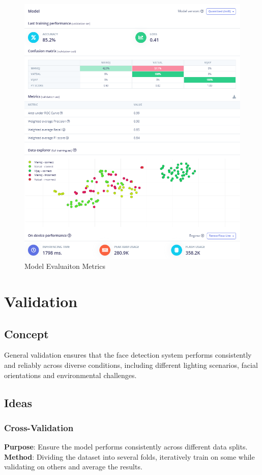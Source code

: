 \begin{figure}
	\begin{center}
		\includegraphics[width=0.7\linewidth]{Images/EdgeImpulse/Interpretation.png}
		\caption{Model Evaluaiton Metrics}
		\label{EvaluationResults}
	\end{center}
\end{figure}

\section{Validation}
\subsection{Concept}
General validation ensures that the face detection system performs consistently and reliably across diverse conditions, including different lighting scenarios, facial orientations and environmental challenges. 

\subsection{Ideas}
\subsubsection{Cross-Validation}
\textbf{Purpose}: Ensure the model performs consistently across different data splits.
\\
\textbf{Method}: Dividing the dataset into several folds, iteratively train on some while validating on others and average the results.


